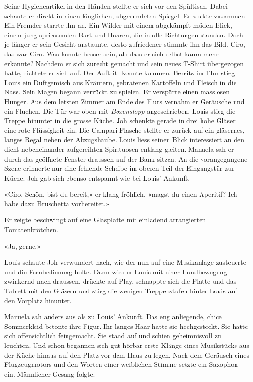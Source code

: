 Seine Hygieneartikel in den Händen stellte er sich vor den Spültisch.
Dabei schaute er direkt in einen länglichen, abgerundeten Spiegel.
Er zuckte zusammen. Ein Fremder starrte ihn an. Ein Wilder mit einem
abgekämpft müden Blick, einem jung spriessenden Bart und Haaren, die in
alle Richtungen standen. Doch je länger er sein Gesicht anstaunte, desto
zufriedener stimmte ihn das Bild. Ciro, das war Ciro. Was konnte besser
sein, als dass er sich selbst kaum mehr erkannte? 
Nachdem er sich zurecht gemacht und sein neues T-Shirt übergezogen
hatte, richtete er sich auf. Der Auftritt konnte kommen. Bereits im Flur
stieg Louis ein Duftgemisch aus Kräutern, gebratenen Kartoffeln und
Fleisch in die Nase. Sein Magen begann verrückt zu spielen. Er verspürte
einen masslosen Hunger. Aus dem letzten Zimmer am Ende des Flurs vernahm
er Geräusche und ein Fluchen. Die Tür war oben mit \emph{Boxenstopp}
angeschrieben.
Louis stieg die Treppe hinunter in die grosse Küche.
Joh schenkte gerade in drei hohe Gläser eine rote Flüssigkeit ein. Die
Campari-Flasche stellte er zurück auf ein gläsernes, langes Regal neben
der Abzugshaube. Louis liess seinen Blick interessiert an den dicht
nebeneinander aufgereihten Spirituosen entlang gleiten. Manuela sah er
durch das geöffnete Fenster draussen auf der Bank sitzen. An die
vorangegangene Szene erinnerte nur eine fehlende Scheibe im oberen Teil
der Eingangstür zur Küche. Joh gab sich ebenso entspannt wie bei Louis’
Ankunft.

«Ciro. Schön, bist du bereit,» er klang fröhlich, «magst du einen
Aperitif? Ich habe dazu Bruschetta vorbereitet.»

Er zeigte beschwingt auf eine Glasplatte mit einladend arrangierten
Tomatenbrötchen.

«Ja, gerne.»

Louis schaute Joh verwundert nach, wie der nun auf eine Musikanlage
zusteuerte und die Fernbedienung holte. Dann wies er Louis mit einer Handbewegung zwinkernd nach draussen, drückte auf Play, schnappte sich die Platte und das Tablett mit den Gläsern und stieg die wenigen Treppenstufen hinter Louis auf den Vorplatz hinunter.

Manuela sah anders aus als zu Louis’ Ankunft. Das eng anliegende, 
chice Sommerkleid betonte ihre Figur. Ihr langes Haar hatte sie
hochgesteckt. Sie hatte sich offensichtlich feingemacht. Sie stand auf
und schien geheimnisvoll zu leuchten. Und schon begannen sich gut hörbar erste Klänge eines Musikstücks aus
der Küche hinaus auf den Platz vor dem Haus zu legen. Nach dem Geräusch
eines Flugzeugmotors und den Worten einer weiblichen Stimme setzte ein
Saxophon ein. Männlicher Gesang folgte.

